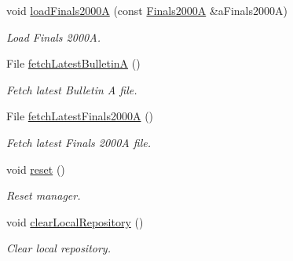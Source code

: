 \begin{DoxyCompactItemize}
void \hyperlink{classostk_1_1physics_1_1coord_1_1frame_1_1provider_1_1iers_1_1_manager_ad79ddb22cfd125d810840611c24a9f42}{load\+Finals2000A} (const \hyperlink{classostk_1_1physics_1_1coord_1_1frame_1_1provider_1_1iers_1_1_finals2000_a}{Finals2000A} \&a\+Finals2000A)
\begin{DoxyCompactList}\small\item\em Load Finals 2000A. \end{DoxyCompactList}\item 
File \hyperlink{classostk_1_1physics_1_1coord_1_1frame_1_1provider_1_1iers_1_1_manager_acb6883a9760e0809627ff695d2586176}{fetch\+Latest\+BulletinA} ()
\begin{DoxyCompactList}\small\item\em Fetch latest Bulletin A file. \end{DoxyCompactList}\item 
File \hyperlink{classostk_1_1physics_1_1coord_1_1frame_1_1provider_1_1iers_1_1_manager_ad0e823d55bb0db0d5547a4b4c8a571fa}{fetch\+Latest\+Finals2000A} ()
\begin{DoxyCompactList}\small\item\em Fetch latest Finals 2000A file. \end{DoxyCompactList}\item 
void \hyperlink{classostk_1_1physics_1_1coord_1_1frame_1_1provider_1_1iers_1_1_manager_ab43eacd0e4e55398731f1d1294c874bc}{reset} ()
\begin{DoxyCompactList}\small\item\em Reset manager. \end{DoxyCompactList}\item 
void \hyperlink{classostk_1_1physics_1_1coord_1_1frame_1_1provider_1_1iers_1_1_manager_a879bfcaadea547229ca94a4375111e9f}{clear\+Local\+Repository} ()
\begin{DoxyCompactList}\small\item\em Clear local repository. \end{DoxyCompactList}\end{DoxyCompactItemize}
